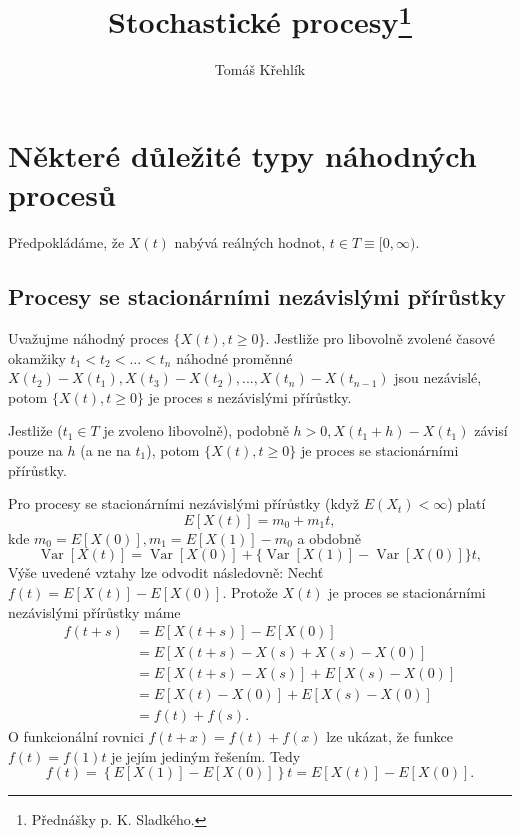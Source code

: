 \documentclass[10pt]{article}
\title{Stochastické procesy\footnote{Přednášky p. K. Sladkého.}}
\author{Tomáš Křehlík}
\date{}
\DeclareMathOperator*{\var}{Var}
\begin{document}
\maketitle

\section{Některé důležité typy náhodných procesů}

Předpokládáme, že $X(t)$ nabývá reálných hodnot, $t \in T \equiv [0, \infty)$.

\subsection{Procesy se stacionárními nezávislými přírůstky}
\label{sec:1.1}
Uvažujme náhodný proces $\{X(t), t \geq 0\}$. Jestliže pro libovolně zvolené časové okamžiky $t_1<t_2<...<t_n$ náhodné proměnné $X(t_2)-X(t_1),X(t_3)-X(t_2),...,X(t_n)-X(t_{n-1})$ jsou nezávislé, potom $\{X(t),t \geq 0\}$ je proces s nezávislými přírůstky.

Jestliže ($t_1\in T$ je zvoleno libovolně), podobně $h>0, X(t_1+h)-X(t_1)$ závisí pouze na $h$ (a ne na $t_1$), potom $\{X(t),t \geq 0\}$ je proces se stacionárními přírůstky.

Pro procesy se stacionárními nezávislými přírůstky (když $E(X_t)<\infty$) platí 
\begin{equation}
E[X(t)] = m_0 + m_1 t,
\end{equation}
kde $m_0=E[X(0)], m_1 = E[X(1)]-m_0$ a obdobně
\begin{equation}
\var[X(t)] = \var[X(0)] + \{\var[X(1)]-\var[X(0)]\} t,
\end{equation}
Výše uvedené vztahy lze odvodit následovně:
Nechť $f(t) = E[X(t)]-E[X(0)]$. Protože $X(t)$ je proces se stacionárními nezávislými přírůstky máme
\begin{equation}
\begin{split}
f(t+s)	&=E[X(t+s)]-E[X(0)]\\
		&=E[X(t+s)-X(s)+X(s)-X(0)]\\
		&=E[X(t+s)-X(s)]+E[X(s)-X(0)]\\
		&=E[X(t)-X(0)]+E[X(s)-X(0)]\\
		&=f(t)+f(s).
\end{split}
\end{equation}
O funkcionální rovnici $f(t+x) = f(t)+f(x)$ lze ukázat, že funkce $f(t)=f(1)t$ je jejím jediným řešením. Tedy
\begin{equation}
f(t) = \left\{E[X(1)]-E[X(0)]\right\}t = E[X(t)]-E[X(0)].
\end{equation}
\end{document}
